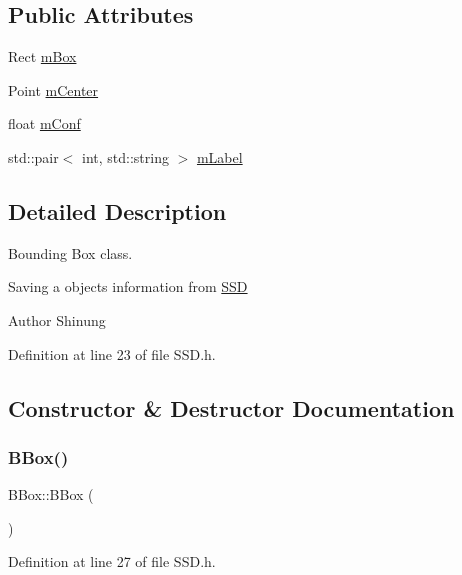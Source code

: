 \subsection*{Public Attributes}
\begin{DoxyCompactItemize}
\item 
Rect \mbox{\hyperlink{class_b_box_ac9143a10a051ff8ce0ae26e6c1e4b4e1}{m\+Box}}
\item 
Point \mbox{\hyperlink{class_b_box_a4367a9314599320633ef19abfae3a83c}{m\+Center}}
\item 
float \mbox{\hyperlink{class_b_box_ac2b9483e6f0372284e06724d7ae953ff}{m\+Conf}}
\item 
std\+::pair$<$ int, std\+::string $>$ \mbox{\hyperlink{class_b_box_a779985e94cd7b9b3c62208493de419be}{m\+Label}}
\end{DoxyCompactItemize}


\subsection{Detailed Description}
Bounding Box class. 

Saving a object\textquotesingle{}s information from \mbox{\hyperlink{class_s_s_d}{S\+SD}} \begin{DoxyAuthor}{Author}
Shinung 
\end{DoxyAuthor}


Definition at line 23 of file S\+S\+D.\+h.



\subsection{Constructor \& Destructor Documentation}
\mbox{\label{class_b_box_ae26e694ee88779b928e8d3726f8213a1}} 
\subsubsection{\texorpdfstring{B\+Box()}{BBox()}\hspace{0.1cm}{\footnotesize\ttfamily [1/4]}}
{\footnotesize\ttfamily B\+Box\+::\+B\+Box (\begin{DoxyParamCaption}{ }\end{DoxyParamCaption})\hspace{0.3cm}{\ttfamily [inline]}}



Definition at line 27 of file S\+S\+D.\+h.


